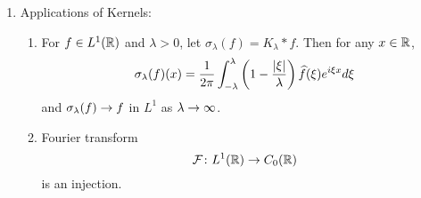 \begin{enumerate}[label=\arabic*.]
	If $f \in C_c^\infty(\R)$, then
	\begin{equation*}
		\widehat{f^\prime}(\xi) = i\xi \widehat{f}(\xi)
	\end{equation*}
	So by above corollary, we can prove the continuous version of Riemannian-Lebesgue lemma.
	\begin{lem}
		For any $f \in L^1(\R)$,
		\begin{equation*}
			\lim_{\abs{\xi} \sto \infty} \widehat{f}(\xi) = 0
		\end{equation*}
	\end{lem}
	\begin{proof}
		For $\varepsilon > 0$, there is a $g \in C_c^\infty(\R)$ such that $\norm{f - g}_1 < \varepsilon$. For $g$, we know $\widehat{g}(\xi) \sto 0$ as $\abs{\xi} \sto \infty$. So
		\begin{equation*}
			\abs{\widehat{f}(\xi)} \leq |\widehat{f}(\xi)-\widehat{g}(\xi)|+|\widehat{g}(\xi)|<\|f-g\|_1+\varepsilon<2 \varepsilon
		\end{equation*}
	\end{proof}

	\item Applications of Kernels: 
	\begin{cor}
		\begin{enumerate}[label=(\arabic{*})]
			\item For $f \in L^1(\R)$ and $\lambda > 0$, let $\sigma_\lambda(f) = K_\lambda * f$. Then for any $x \in \mathbb{R}$,
			\begin{equation*}
				\sigma_\lambda(f)(x) = \frac{1}{2\pi}\int_{-\lambda}^\lambda \left(1 - \frac{\left\lvert\xi\right\lvert}{\lambda}\right)\widehat{f}(\xi)e^{i\xi x}d\xi
			\end{equation*}
			and $\sigma_\lambda(f) \rightarrow f$ in $L^1$ as $\lambda \rightarrow \infty$.
			\item Fourier transform
			\begin{equation*}
				\mathcal{F} \colon L^1(\mathbb{R}) \rightarrow C_0(\mathbb{R})
			\end{equation*}
			is an injection.
		\end{enumerate}
	\end{cor}


\end{enumerate}
